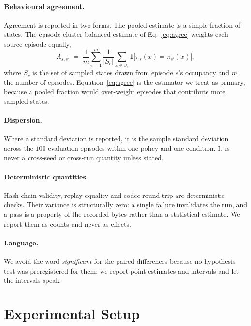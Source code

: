 \documentclass[11pt,a4paper]{article}
\begin{document}
\paragraph{Behavioural agreement.} Agreement is reported in two forms. The pooled estimate is a simple fraction of states. The episode-cluster balanced estimate of Eq.~\eqref{eq:agree} weights each source episode equally,
\begin{equation}
\label{eq:agree}
\bar{A}_{s,s'} \;=\; \frac{1}{m}\sum_{e=1}^{m}\frac{1}{|S_{e}|}\sum_{x\in S_{e}} \mathbf{1}\bigl[\pi_{s}(x)=\pi_{s'}(x)\bigr],
\end{equation}
where $S_{e}$ is the set of sampled states drawn from episode $e$'s occupancy and $m$ the number of episodes. Equation~\eqref{eq:agree} is the estimator we treat as primary, because a pooled fraction would over-weight episodes that contribute more sampled states.

\paragraph{Dispersion.} Where a standard deviation is reported, it is the sample standard deviation across the $100$ evaluation episodes within one policy and one condition. It is never a cross-seed or cross-run quantity unless stated.

\paragraph{Deterministic quantities.} Hash-chain validity, replay equality and codec round-trip are deterministic checks. Their variance is structurally zero: a single failure invalidates the run, and a pass is a property of the recorded bytes rather than a statistical estimate. We report them as counts and never as effects.

\paragraph{Language.} We avoid the word \emph{significant} for the paired differences because no hypothesis test was preregistered for them; we report point estimates and intervals and let the intervals speak.

\section{Experimental Setup}
\label{sec:setup}
\end{document}

